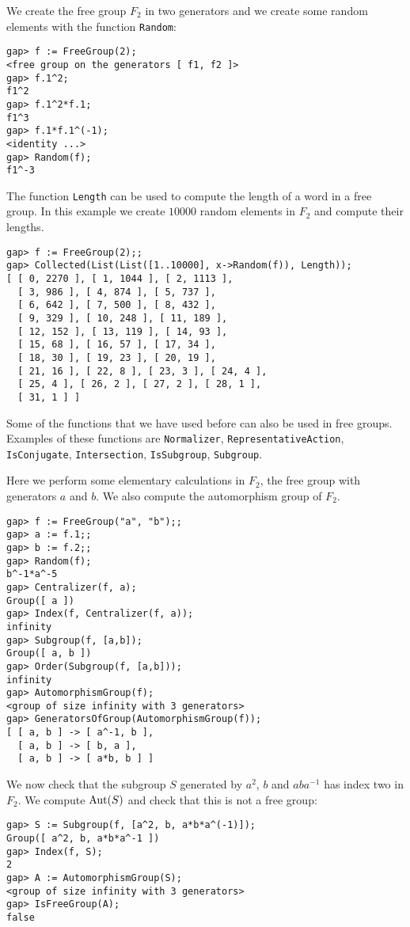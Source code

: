 \begin{example}
We create the free group $F_2$ in two generators and we create some random
elements with the function 
\lstinline{Random}:
\begin{lstlisting}
gap> f := FreeGroup(2);
<free group on the generators [ f1, f2 ]>
gap> f.1^2;
f1^2
gap> f.1^2*f.1;
f1^3
gap> f.1*f.1^(-1);
<identity ...>
gap> Random(f);
f1^-3
\end{lstlisting}
\end{example}

\begin{example}
The function \lstinline{Length} can be used to compute the length of a word in a
free group. 
In this example we create $10000$ random elements in $F_2$ and compute their lengths.
\begin{lstlisting}
gap> f := FreeGroup(2);;
gap> Collected(List(List([1..10000], x->Random(f)), Length));
[ [ 0, 2270 ], [ 1, 1044 ], [ 2, 1113 ], 
  [ 3, 986 ], [ 4, 874 ], [ 5, 737 ], 
  [ 6, 642 ], [ 7, 500 ], [ 8, 432 ], 
  [ 9, 329 ], [ 10, 248 ], [ 11, 189 ], 
  [ 12, 152 ], [ 13, 119 ], [ 14, 93 ], 
  [ 15, 68 ], [ 16, 57 ], [ 17, 34 ], 
  [ 18, 30 ], [ 19, 23 ], [ 20, 19 ], 
  [ 21, 16 ], [ 22, 8 ], [ 23, 3 ], [ 24, 4 ], 
  [ 25, 4 ], [ 26, 2 ], [ 27, 2 ], [ 28, 1 ], 
  [ 31, 1 ] ]
\end{lstlisting}
\end{example}

Some of the functions that we have used before can also be used in free groups. Examples
of these functions are \lstinline{Normalizer},
\lstinline{RepresentativeAction}, \lstinline{IsConjugate},
\lstinline{Intersection}, \lstinline{IsSubgroup}, \lstinline{Subgroup}. 

\begin{example}
Here we perform some elementary calculations in $F_2$, the free group with
generators $a$ and $b$. We also compute the automorphism group of $F_2$. 
\begin{lstlisting}
gap> f := FreeGroup("a", "b");;
gap> a := f.1;;
gap> b := f.2;;
gap> Random(f);
b^-1*a^-5
gap> Centralizer(f, a);
Group([ a ])
gap> Index(f, Centralizer(f, a));
infinity
gap> Subgroup(f, [a,b]);
Group([ a, b ])
gap> Order(Subgroup(f, [a,b]));
infinity
gap> AutomorphismGroup(f);
<group of size infinity with 3 generators>
gap> GeneratorsOfGroup(AutomorphismGroup(f));
[ [ a, b ] -> [ a^-1, b ], 
  [ a, b ] -> [ b, a ], 
  [ a, b ] -> [ a*b, b ] ]
\end{lstlisting}
We now check that the subgroup $S$ generated by $a^2$, $b$ and $aba^{-1}$ has
index two in $F_2$. We compute $\operatorname{Aut}(S)$ and check that this is not a free
group: 
\begin{lstlisting}
gap> S := Subgroup(f, [a^2, b, a*b*a^(-1)]);
Group([ a^2, b, a*b*a^-1 ])
gap> Index(f, S);
2
gap> A := AutomorphismGroup(S);
<group of size infinity with 3 generators>
gap> IsFreeGroup(A);
false
\end{lstlisting}
\end{example}

